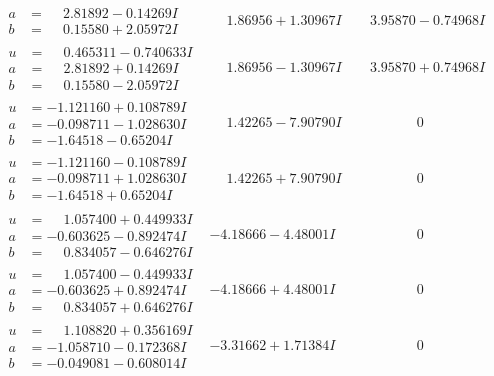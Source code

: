 \documentclass[1p]{elsarticle_modified}
\theoremstyle{definition}
\begin{document}
$$\begin{array}{c|c|c}
\begin{aligned}
a &= \phantom{-}2.81892 - 0.14269 I \\
b &= \phantom{-}0.15580 + 2.05972 I\end{aligned}
 & \phantom{-}1.86956 + 1.30967 I & \phantom{-}3.95870 - 0.74968 I \\ \hline\begin{aligned}
u &= \phantom{-}0.465311 - 0.740633 I \\
a &= \phantom{-}2.81892 + 0.14269 I \\
b &= \phantom{-}0.15580 - 2.05972 I\end{aligned}
 & \phantom{-}1.86956 - 1.30967 I & \phantom{-}3.95870 + 0.74968 I \\ \hline\begin{aligned}
u &= -1.121160 + 0.108789 I \\
a &= -0.098711 - 1.028630 I \\
b &= -1.64518 - 0.65204 I\end{aligned}
 & \phantom{-}1.42265 - 7.90790 I & \phantom{-0.000000 } 0 \\ \hline\begin{aligned}
u &= -1.121160 - 0.108789 I \\
a &= -0.098711 + 1.028630 I \\
b &= -1.64518 + 0.65204 I\end{aligned}
 & \phantom{-}1.42265 + 7.90790 I & \phantom{-0.000000 } 0 \\ \hline\begin{aligned}
u &= \phantom{-}1.057400 + 0.449933 I \\
a &= -0.603625 - 0.892474 I \\
b &= \phantom{-}0.834057 - 0.646276 I\end{aligned}
 & -4.18666 - 4.48001 I & \phantom{-0.000000 } 0 \\ \hline\begin{aligned}
u &= \phantom{-}1.057400 - 0.449933 I \\
a &= -0.603625 + 0.892474 I \\
b &= \phantom{-}0.834057 + 0.646276 I\end{aligned}
 & -4.18666 + 4.48001 I & \phantom{-0.000000 } 0 \\ \hline\begin{aligned}
u &= \phantom{-}1.108820 + 0.356169 I \\
a &= -1.058710 - 0.172368 I \\
b &= -0.049081 - 0.608014 I\end{aligned}
 & -3.31662 + 1.71384 I & \phantom{-0.000000 } 0 \\ \hline\begin{aligned}

\end{aligned}
\end{array}$$
\end{document}

